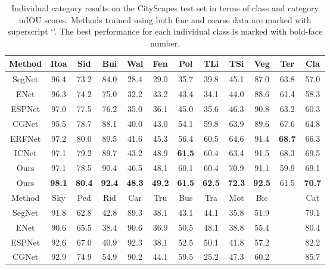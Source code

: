 \documentclass[runningheads]{llncs}
\begin{document}
\begin{table}[!t]
\tabcolsep 1.25mm \caption{Individual category results on the CityScapes test set in terms of class and category mIOU scores. Methods trained using both fine and coarse data are marked with superscript `'. The best performance for each individual class is marked with bold-face number.}
\begin{center}
\begin{tabular}{|c|cccccccccc|c|}
\hline
Method  &{Roa}  &{Sid}  &{Bui}  &{Wal}  &{Fen}  &{Pol}  &{TLi}  &{TSi}  &{Veg}  &{Ter}    &{Cla}\\
\hline
\hline
SegNet \cite{Badrinarayanan2015Segnet} &96.4 &73.2 &84.0 &28.4 &29.0 &35.7 &39.8 &45.1 &87.0 &63.8 &57.0\\
ENet \cite{Paszke2016enet}             &96.3 &74.2 &75.0 &32.2 &33.2 &43.4 &34.1 &44.0 &88.6 &61.4 &58.3\\
ESPNet \cite{Mehta2018espnet}          &97.0 &77.5 &76.2 &35.0 &36.1 &45.0 &35.6 &46.3 &90.8 &63.2 &60.3\\
CGNet \cite{wu2018cgnet}               &95.5 &78.7 &88.1 &40.0 &43.0 &54.1 &59.8 &63.9 &89.6 &67.6 &64.8\\
ERFNet \cite{Romera2018erfnet}         &97.2 &80.0 &89.5 &41.6 &45.3 &56.4 &60.5 &64.6 &91.4 &\textbf{68.7} &66.3\\
ICNet \cite{Zhao2018ICnet}             &97.1 &79.2 &89.7 &43.2 &48.9 &\textbf{61.5} &60.4 &63.4 &91.5 &68.3 &69.5\\
\hline
Ours                                   &97.1 &78.5 &90.4 &46.5 &48.1 &60.1 &60.4 &70.9 &91.1 &59.9 &69.1\\
Ours                          &\textbf{98.1} &\textbf{80.4} &\textbf{92.4} &\textbf{48.3} &\textbf{49.2} &\textbf{61.5} &\textbf{62.5} &\textbf{72.3} &\textbf{92.5} &61.5 &\textbf{70.7}\\
\hline
\hline
Method  &{Sky}  &{Ped}  &{Rid}  &{Car}  &{Tru}  &{Bus}  &{Tra}  &{Mot}  &{Bic}  &{~}    &{Cat}\\
\hline
\hline
SegNet \cite{Badrinarayanan2015Segnet} &91.8 &62.8 &42.8 &89.3 &38.1 &43.1 &44.1 &35.8 &51.9 &~ &79.1\\
ENet \cite{Paszke2016enet}             &90.6 &65.5 &38.4 &90.6 &36.9 &50.5 &48.1 &38.8 &55.4 &~ &80.4\\
ESPNet \cite{Mehta2018espnet}          &92.6 &67.0 &40.9 &92.3 &38.1 &52.5 &50.1 &41.8 &57.2 &~ &82.2\\
CGNet \cite{wu2018cgnet}               &92.9 &74.9 &54.9 &90.2 &44.1 &59.5 &25.2 &47.3 &60.2 &~ &85.7\\

\end{tabular}
\end{center}
\end{table}
\end{document}
